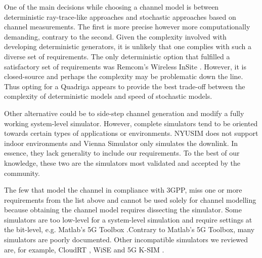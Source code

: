 One of the main decisions while choosing a channel model is between deterministic ray-trace-like approaches and stochastic approaches based on channel measurements. The first is more precise however more computationally demanding, contrary to the second. Given the complexity involved with developing deterministic generators, it is unlikely that one complies with such a diverse set of requirements. The only deterministic option that fulfilled a satisfactory set of requirements was Remcom's Wireless InSite \cite{remcom}. However, it is closed-source and perhaps the complexity may be problematic down the line. Thus opting for a \ac{Quadriga} appears to provide the best trade-off between the complexity of deterministic models and speed of stochastic models.


Other alternative could be to side-step channel generation and modify a fully working system-level simulator. However, complete simulators tend to be oriented towards certain types of applications or environments. NYUSIM \cite{nyusim} does not support indoor environments and Vienna Simulator \cite{Vienna5GSLS} only simulates the downlink. In essence, they lack generality to include our requirements. To the best of our knowledge, these two are the simulators most validated and accepted by the community.

The few that model the channel in compliance with 3GPP, miss one or more requirements from the list above and cannot be used solely for channel modelling because obtaining the channel model requires dissecting the simulator. Some simulators are too low-level for a system-level simulation and require settings at the bit-level, e.g. Matlab's 5G Toolbox \cite{5G_toolbox}.Contrary to Matlab's 5G Toolbox, many simulators are poorly documented. Other incompatible simulators we reviewed are, for example, CloudRT \cite{cloudRT}, WiSE \cite{wise} and 5G K-SIM \cite{8610404}.




